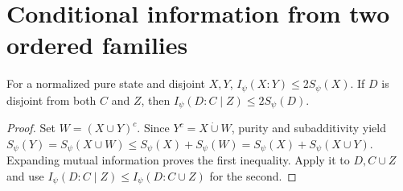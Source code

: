 \section{Conditional information from two ordered families}

\begin{theorem}
    \label{thm:finite_product_twice_entropy_information}
    \leanok
    For a normalized pure state and disjoint $X,Y$,
    $I_\psi(X:Y)\le2S_\psi(X)$.
    If $D$ is disjoint from both $C$ and $Z$, then
    $I_\psi(D:C\mid Z)\le2S_\psi(D)$.
\end{theorem}
\begin{proof}\leanok
    Set $W=(X\cup Y)^c$. Since $Y^c=X\mathbin{\dot\cup}W$, purity and
    subadditivity yield
    $S_\psi(Y)=S_\psi(X\cup W)\le S_\psi(X)+S_\psi(W)
    =S_\psi(X)+S_\psi(X\cup Y)$.
    Expanding mutual information proves the first inequality. Apply it to
    $D,C\cup Z$ and use
    $I_\psi(D:C\mid Z)\le I_\psi(D:C\cup Z)$ for the second.
\end{proof}

